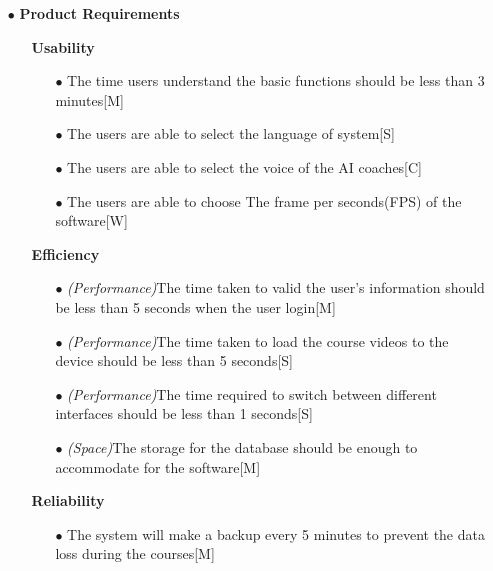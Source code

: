 \documentclass[a4paper]{article}
\begin{document}
	\begin{itemize}
		\item[$\bullet$] {\large\textbf{Product Requirements}}
		\begin{itemize}
			\item[] \textbf{Usability}
			\begin{itemize}
				\item[$\bullet$] The time users understand the basic functions should be less than 3 minutes\hfill[M]
				\item[$\bullet$] The users are able to select the language of system\hfill[S]
				\item[$\bullet$] The users are able to select the voice of the AI coaches\hfill[C]
				\item[$\bullet$] The users are able to choose The frame per seconds(FPS) of the software\hfill[W]
			\end{itemize}
		\end{itemize}
		\begin{itemize}
			\item[] \textbf{Efficiency}
			\begin{itemize}
				\item[$\bullet$] {\footnotesize\textit{(Performance)}}The time taken to valid the user's information should be less than 5 seconds when the user login\hfill[M]
				\item[$\bullet$] {\footnotesize\textit{(Performance)}}The time taken to load the course videos to the device should be less than 5 seconds\hfill[S]
				\item[$\bullet$] {\footnotesize\textit{(Performance)}}The time required to switch between different interfaces should be less than 1 seconds\hfill[S]
				\item[$\bullet$] {\footnotesize\textit{(Space)}}The storage for the database should be enough to accommodate for the software\hfill[M]
			\end{itemize}
		\end{itemize}
		\begin{itemize}
			\item[] \textbf{Reliability}
			\begin{itemize}
				\item[$\bullet$] The system will make a backup every 5 minutes to prevent the data loss during the courses\hfill[M]

\end{itemize}
\end{itemize}
\end{itemize}
\end{document}
